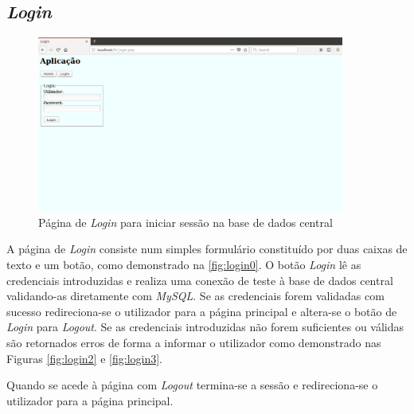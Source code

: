 \documentclass[11pt,twoside,a4paper]{report}
\begin{document}
\subsection{\textit{Login}}
\begin{figure}[H]
	\begin{center}
		\includegraphics[width=0.9\textwidth]{login01} %
		\caption{Página de \textit{Login} para iniciar sessão na base de dados central}
		\label{fig:login0}
	\end{center}
\end{figure}
A página de \textit{Login} consiste num simples formulário constituído por duas caixas de texto e um botão, como demonstrado na \autoref*{fig:login0}. O botão \textit{Login} lê as credenciais introduzidas e realiza uma conexão de teste à base de dados central validando-as diretamente com \textit{MySQL}. Se as credenciais forem validadas com sucesso redireciona-se o utilizador para a página principal e altera-se o botão de \textit{Login} para \textit{Logout}. Se as credenciais introduzidas não forem suficientes ou válidas são retornados erros de forma a informar o utilizador como demonstrado nas Figuras \ref{fig:login2} e \ref{fig:login3}.\par 
Quando se acede à página com \textit{Logout} termina-se a sessão e redireciona-se o utilizador para a página principal.
\end{document}
